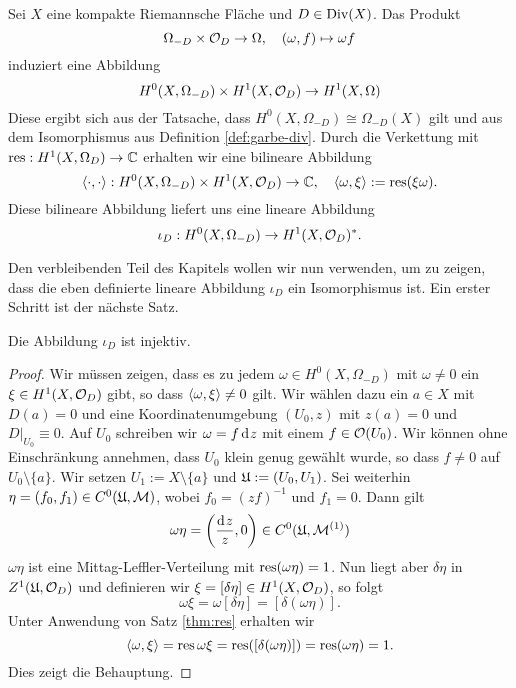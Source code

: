 \begin{defin}
  Sei $X$ eine kompakte Riemannsche Fläche und $D \in \operatorname{Div}(X)$. Das
  Produkt
  \[
  \Omega_{-D} \times \mathcal{O}_D \rightarrow \Omega, \quad (\omega, f) \mapsto
  \omega f
  \]
  induziert eine Abbildung
  \[
  H^0(X, \Omega_{-D}) \times H^1(X, \mathcal{O}_D) \rightarrow H^1(X, \Omega)
  \]
  Diese ergibt sich aus der Tatsache, dass $H^0(X, \Omega_{-D}) \cong
  \Omega_{-D}(X)$ gilt und aus dem Isomorphismus aus Definition
  \ref{def:garbe-div}. Durch die Verkettung mit $\operatorname{res}: H^1(X,
  \Omega_D) \rightarrow \mathbb{C}$ erhalten wir eine bilineare Abbildung
  \[
  \langle \cdot, \cdot \rangle: H^0(X, \Omega_{-D}) \times H^1(X, \mathcal{O}_D) \rightarrow \mathbb{C},
  \quad \langle \omega, \xi \rangle := \operatorname{res}(\xi \omega).
  \]
  Diese bilineare Abbildung liefert uns eine lineare Abbildung
  \[
  \iota_D : H^0(X, \Omega_{-D}) \rightarrow H^1(X, \mathcal{O}_D)^\ast.
  \]
\end{defin}

Den verbleibenden Teil des Kapitels wollen wir nun verwenden, um zu zeigen, dass die
eben definierte lineare Abbildung $\iota_D$ ein Isomorphismus ist. Ein
erster Schritt ist der nächste Satz.

\begin{thm}
  \label{thm:iota-inj}
  Die Abbildung $\iota_D$ ist injektiv.
\end{thm}

\begin{proof}
  Wir müssen zeigen, dass es zu jedem $\omega \in H^0(X, \Omega_{-D})$
  mit $\omega \neq 0$ ein $\xi \in H^1(X, \mathcal{O}_D)$ gibt, so dass
  $\langle \omega, \xi \rangle \neq 0$ gilt. Wir wählen dazu ein $a \in X$ mit
  $D(a) = 0$ und eine Koordinatenumgebung $(U_0, z)$ mit $z(a) = 0$
  und $D|_{U_0} \equiv 0$. Auf $U_0$ schreiben wir $\omega = f \d[z]$
  mit einem $f \in \mathcal{O}(U_0)$. Wir können ohne Einschränkung annehmen,
  dass $U_0$ klein genug gewählt wurde, so dass $f \neq 0$ auf $U_0
  \setminus \{a\}$. Wir setzen $U_1 := X \setminus \{a\}$ und $\mathfrak{U} :=
  (U_0, U_1)$. Sei weiterhin $\eta = (f_0, f_1) \in C^0(\mathfrak{U}, \mathcal{M})$,
  wobei $f_0 = (z f)^{-1}$ und $f_1 = 0$. Dann gilt
  \[
  \omega \eta = \left ( \frac{\d[z]}{z}, 0 \right ) \in C^0(\fu,
  \mer^{(1)})
  \]
  $\omega \eta$ ist eine Mittag-Leffler-Verteilung mit
  $\operatorname{res}(\omega\eta) = 1$. Nun liegt aber $\delta \eta$ in $Z^1(\mathfrak{U},
  \mathcal{O}_D)$ und definieren wir $\xi = [\delta \eta] \in H^1(X,
  \mathcal{O}_D)$, so folgt
  \[
  \omega \xi = \omega [\delta \eta] = [ \delta( \omega \eta)].
  \]
  Unter Anwendung von Satz \ref{thm:res} erhalten wir
  \[
  \langle \omega, \xi \rangle = \operatorname{res}{\omega \xi} = \operatorname{res}([\delta(\omega \eta)]) =
  \operatorname{res}(\omega \eta) = 1.
  \]
  Dies zeigt die Behauptung.
\end{proof}

